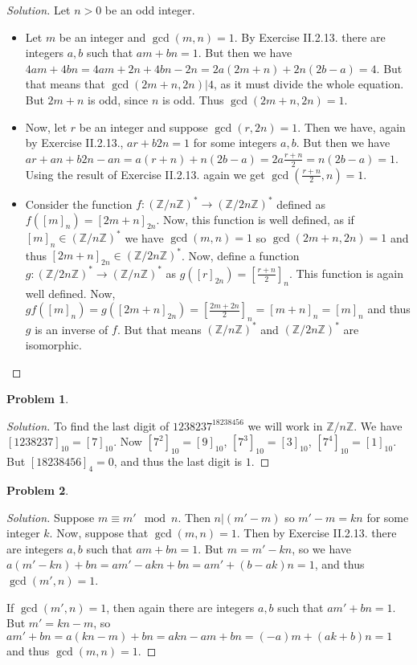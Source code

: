 \documentclass{article}
\theoremstyle{definition}
\newtheorem{problem-internal}{Problem}[subsection]
\newenvironment{problem}{
	\medskip
	\begin{problem-internal}
	}{
\end{problem-internal}
}
\newenvironment{solution}{
	\begin{proof}[Solution]
		\vspace{-8px}
		\setlength{\parskip}{4px}
		\setlength{\parindent}{0px}
	}{
\end{proof}
}
\begin{document}
\begin{solution}
	Let $n > 0$ be an odd integer.
	\begin{itemize}
		\item Let $m$ be an integer and $\gcd(m,n)=1$. By Exercise II.2.13. there are integers $a,b$ such that $am+bn=1$. But then we have $4am+4bn=4am+2n+4bn-2n=2a(2m+n)+2n(2b-a)=4$. But that means that $\gcd(2m+n,2n) | 4$, as it must divide the whole equation. But $2m+n$ is odd, since $n$ is odd. Thus $\gcd(2m+n,2n)=1$.
		\item Now, let $r$ be an integer and suppose $\gcd(r,2n)=1$. Then we have, again by Exercise II.2.13., $ar+b2n=1$ for some integers $a,b$. But then we have $ar+an+b2n-an=a(r+n)+n(2b-a)=2a\frac{r+n}{2}=n(2b-a)=1$. Using the result of Exercise II.2.13. again we get $\gcd(\frac{r+n}{2},n)=1$.
		\item Consider the function $f: (\mathbb{Z}/n\mathbb{Z})^* \to (\mathbb{Z}/2n\mathbb{Z})^*$ defined as $f([m]_n)=[2m+n]_{2n}$. Now, this function is well defined, as if $[m]_n \in (\mathbb{Z}/n\mathbb{Z})^*$ we have $\gcd(m,n)=1$ so $\gcd(2m+n,2n)=1$ and thus $[2m+n]_{2n} \in (\mathbb{Z}/2n\mathbb{Z})^*$. Now, define a function $g: (\mathbb{Z}/2n\mathbb{Z})^* \to (\mathbb{Z}/n\mathbb{Z})^*$ as $g([r]_{2n})=[\frac{r+n}{2}]_n$. This function is again well defined. Now, $gf([m]_n)=g([2m+n]_{2n})=[\frac{2m+2n}{2}]_n=[m+n]_n=[m]_n$ and thus $g$ is an inverse of $f$. But that means $(\mathbb{Z}/n\mathbb{Z})^*$ and $(\mathbb{Z}/2n\mathbb{Z})^*$ are isomorphic.
	\end{itemize}
\end{solution}

\begin{problem}
\end{problem}

\begin{solution}
	To find the last digit of $1238237^{18238456}$ we will work in $\mathbb{Z}/n\mathbb{Z}$. We have $[1238237]_10=[7]_10$. Now $[7^2]_10=[9]_10$, $[7^3]_10=[3]_10$, $[7^4]_10=[1]_10$. But $[18238456]_4=0$, and thus the last digit is $1$.	
\end{solution}

\begin{problem}
\end{problem}

\begin{solution}
	Suppose $m \equiv m' \mod n$. Then $n | (m' - m)$ so $m' - m = kn$ for some integer $k$. Now, suppose that $\gcd(m,n)=1$. Then by Exercise II.2.13. there are integers $a,b$ such that $am+bn=1$. But $m = m' - kn$, so we have $a(m' - kn)+bn=am'-akn+bn=am'+(b-ak)n=1$, and thus $\gcd(m',n)=1$. 
	
	If $\gcd(m',n)=1$, then again there are integers $a,b$ such that $am'+bn=1$. But $m' = kn - m$, so $am'+bn=a(kn - m) + bn=akn-am+bn=(-a)m+(ak+b)n=1$ and thus $\gcd(m,n)=1$.
\end{solution}
\end{document}
